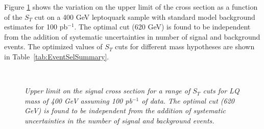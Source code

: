 Figure \ref{fig:optimization} shows the variation on the upper limit of the cross section as a function of 
the $S_T$ cut on a 400 GeV leptoquark sample with standard model background estimates for 100 pb$^{-1}$.  
The optimal cut (620 GeV) is found to be independent from the addition 
of systematic uncertainties in number of signal and background events.
The optimized values of $S_{T}$ cuts for different mass hypotheses are shown in Table~\ref{tab:EventSelSummary}. 
%
\begin{figure}[htbp]
  \begin{center}
       \\
    \caption{\small \sl Upper limit on the signal cross section for a range of $S_T$ cuts for LQ mass of 400 GeV 
      assuming 100 pb$^{-1}$ of data. 
      The optimal cut (620 GeV) is found to be independent from the addition of systematic uncertainties in the 
      number of signal and background events.}
    \label{fig:optimization}
  \end{center}
\end{figure}
%

%
